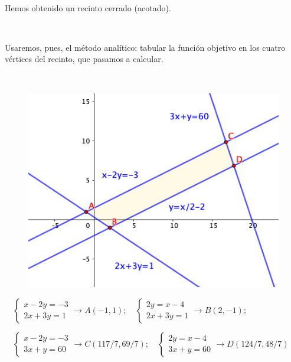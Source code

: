 \vspace{5mm}
\begin{multicols}{2}
$\quad$

Hemos obtenido un recinto cerrado (acotado). 

$\quad$

Usaremos, pues, el método analítico: tabular la función objetivo en los cuatro vértices del recinto, que pasamos a calcular.

$\quad$
\begin{figure}[H]
	\centering
	\includegraphics[width=.5\textwidth]{imagenes/img30.png}
\end{figure}
\end{multicols}

\vspace{5mm} $\quad \begin{cases}
x-2y=-3\\2x+3y=1	
\end{cases}\to A(-1,1); \quad
\begin{cases}
2y=x-4\\ 2x+3y=1	
\end{cases}\to B(2,-1);$

\vspace{5mm} $\quad \begin{cases}
x-2y=-3\\ 3x+y=60	
\end{cases}\to C(117/7,69/7); \quad
\begin{cases}
2y=x-4\\3x+y=60
\end{cases}\to D(124/7,48/7)$

